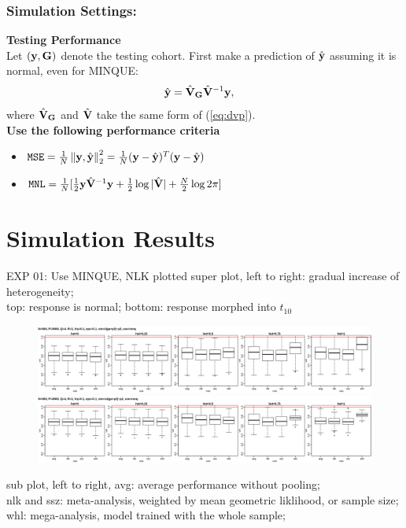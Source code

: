 \documentclass{beamer}
\begin{document}
\begin{frame}
  \frametitle{Simulation Settings:} %
  \textbf{Testing Performance} \\
  Let $(\mathbf{y}, \mathbf{G})$ denote the testing cohort. First make a prediction
  of $\hat{\mathbf{y}}$ assuming it is normal, even for MINQUE:
  \begin{align}
    \begin{split}
      \hat{\mathbf{y}} &= \hat{\mathbf{V}}_\mathbf{G} \hat{\mathbf{V}}^{-1} \mathbf{y},
    \end{split}
  \end{align}
  where $\hat{\mathbf{V}}_\mathbf{G}$ and $\hat{\mathbf{V}}$ take the same form of (\ref{eq:dvp}).\\
  \textbf{Use the following performance criteria}
  \begin{itemize}
  \item
    $\mathtt{MSE} = \frac{1}{N} \left\lVert\mathbf{y}, \hat{\mathbf{y}}\right\rVert_2^2 =
    \frac{1}{N} (\mathbf{y}-\hat{\mathbf{y}})^T(\mathbf{y}-\hat{\mathbf{y}})$
  \item
    $\mathtt{MNL} = \frac{1}{N} [\frac{1}{2}\mathbf{y}\hat{\mathbf{V}}^{-1}\mathbf{y} +
    \frac{1}{2}\log{|\hat{\mathbf{V}}|} + \frac{N}{2}\log{2\pi}]$
  \end{itemize}
\end{frame}
\section{Simulation Results}
\begin{frame}{EXP 01: Use MINQUE, NLK plotted}
  \scriptsize super plot, left to right: gradual increase of heterogeneity;\\
  top: response is normal; bottom: response morphed into $t_{10}$ \\
  \normalsize
  \begin{figure}
    \includegraphics[width=\linewidth]{km2_mnq_s01.png} \\
    \includegraphics[width=\linewidth]{km2_mnq_s02.png}
  \end{figure}
  \tiny sub plot, left to right, avg: average performance without pooling;\\
  nlk and ssz: meta-analysis, weighted by mean geometric liklihood, or sample size; \\
  whl: mega-analysis, model trained with the whole sample;
\end{frame}
\end{document}
